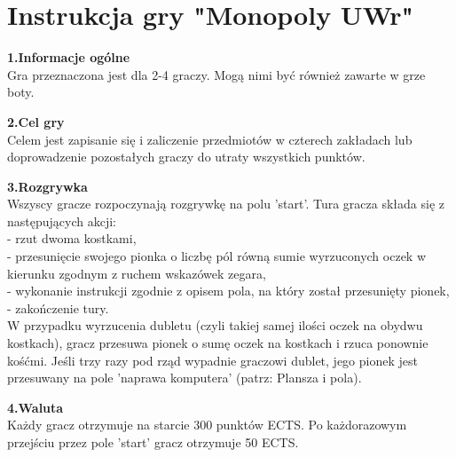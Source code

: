 \documentclass[a4paper]{article}
\author{}
\title{}
\date{\today}
\begin{document}
\section*{Instrukcja gry "Monopoly UWr"}

\noindent \textbf{1.Informacje ogólne}\\
\noindent Gra przeznaczona jest dla 2-4 graczy. Mogą nimi być również zawarte w grze boty.
\vspace{10pt}

\noindent \textbf{2.Cel gry}\\
\noindent Celem jest zapisanie się i zaliczenie przedmiotów w czterech zakładach lub doprowadzenie pozostałych graczy do utraty wszystkich punktów.
\vspace{10pt}

\noindent \textbf{3.Rozgrywka}\\
\noindent Wszyscy gracze rozpoczynają rozgrywkę na polu 'start'. Tura gracza składa się z następujących akcji:\\
- rzut dwoma kostkami,\\
- przesunięcie swojego pionka o liczbę pól równą sumie wyrzuconych oczek w kierunku zgodnym z ruchem wskazówek zegara,\\
- wykonanie instrukcji zgodnie z opisem pola, na który został przesunięty pionek,\\
- zakończenie tury.\\
W przypadku wyrzucenia dubletu (czyli takiej samej ilości oczek na obydwu kostkach), gracz przesuwa pionek o sumę oczek na kostkach i rzuca ponownie kośćmi. Jeśli trzy razy pod rząd wypadnie graczowi dublet, jego pionek jest przesuwany na pole 'naprawa komputera' (patrz: Plansza i pola). 
\vspace{10pt}

\noindent \textbf{4.Waluta}\\
\noindent Każdy gracz otrzymuje na starcie 300 punktów ECTS. Po każdorazowym przejściu przez pole 'start' gracz otrzymuje 50 ECTS.
\vspace{10pt}
\end{document}

